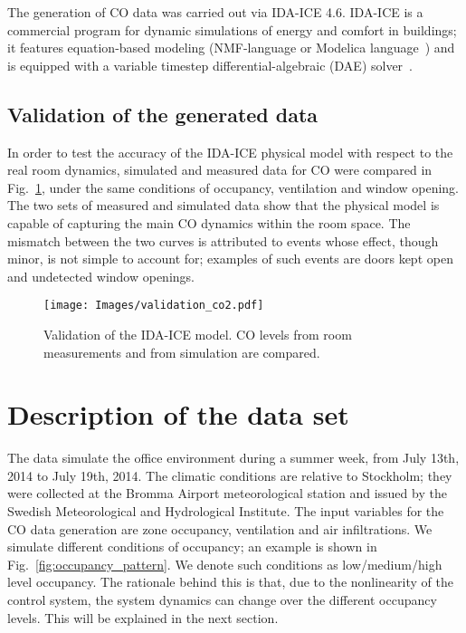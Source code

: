 \documentclass{article}
\begin{document}
The generation of CO data was carried out via IDA-ICE 4.6. IDA-ICE is a
commercial program for dynamic simulations of energy and comfort in
buildings; it features equation-based modeling (NMF-language or Modelica
language~\cite{fritzson2010principles}) and is equipped with a variable timestep
differential-algebraic (DAE) solver~\cite{sahlin2004whole}.

\subsection{Validation of the generated data}

In order to test the accuracy of the IDA-ICE physical model with respect to the
real room dynamics, simulated and measured data for CO were compared in
Fig.~\ref{fig:Physical_model_validation}, under the same conditions of
occupancy, ventilation and window opening. The two sets of measured and
simulated data show that the physical model is capable of capturing the main
CO dynamics within the room space. The mismatch between the two curves is
attributed to events whose effect, though minor, is not simple to account for;
examples of such events are doors kept open and undetected window openings.

\begin{figure}[htb]
\centering
\texttt{[image: Images/validation\_co2.pdf]}
\caption{Validation of the IDA-ICE model. CO levels from room measurements
and from simulation are compared.}
\label{fig:Physical_model_validation}
\end{figure}

\section{Description of the data set}\label{sec:dataset}
The data simulate the office environment during a summer week, from July 13th,
2014 to July 19th, 2014. The climatic conditions are relative to Stockholm;
they were collected at the Bromma Airport meteorological station and issued by
the Swedish Meteorological and Hydrological Institute. The input variables for
the CO data generation are zone occupancy, ventilation and air
infiltrations. We simulate different conditions of occupancy; an example is
shown in
Fig.~\ref{fig:occupancy_pattern}. We denote such conditions as low/medium/high
level occupancy. The rationale behind this is that, due to the nonlinearity of
the control system, the system dynamics can change over the different
occupancy levels. This will be explained in the next section.
\end{document}
